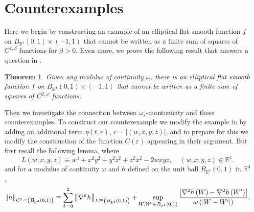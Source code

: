 \documentclass{amsart}
\newtheorem{theorem}{Theorem}[section]
\theoremstyle{plain}
\numberwithin{equation}{section}
\begin{document}
\section{Counterexamples}

Here we begin by constructing an example of an elliptical flat smooth
function $f$ on $B_{\mathbb{R}^{4}}\left( 0,1\right) \times \left(
-1,1\right) $ that cannot be written as a finite sum of squares of $%
C^{2,\beta }$ functions for $\beta >0$. Even more, we prove the following
result that answers a question in \cite[Remark 1.4]{BoBrCoPe}.

\begin{theorem}
Given any modulus of continuity $\omega $, there is an elliptical flat
smooth function $f$ on $B_{\mathbb{R}^{4}}\left( 0,1\right) \times \left(
-1,1\right) $ that cannot be written as a finite sum of squares of $%
C^{2,\omega }$ functions.
\end{theorem}

Then we investigate the connection between $\omega _{s}$-montonicity and
these counterexamples. To construct our counterexample we modify the example
in \cite[Theorem 1.2 (d)]{BoBrCoPe} by adding an additional term $\eta
\left( t,r\right) $, $r=\left\vert \left( w,x,y,z\right) \right\vert $, and
to prepare for this we modify the construction of the function $C\left(
\varepsilon \right) $ appearing in their argument. But first recall the
following lemma, where%
\begin{equation*}
L\left( w,x,y,z\right) \equiv w^{4}+x^{2}y^{2}+y^{2}z^{2}+z^{2}x^{2}-2wxyz,\
\ \ \ \ \left( w,x,y,z\right) \in \mathbb{R}^{4}.
\end{equation*}%
and for a modulus of continuity $\omega $ and $h$ defined on the unit ball $%
B_{\mathbb{R}^{4}}\left( 0,1\right) $ in $\mathbb{R}^{4}$, 
\begin{equation*}
\left\Vert h\right\Vert _{C^{2,\omega }\left( B_{\mathbb{R}^{4}}\left(
0,1\right) \right) }\equiv \sum_{k=0}^{2}\left\Vert \nabla ^{k}h\right\Vert
_{L^{\infty }\left( B_{\mathbb{R}^{4}}\left( 0,1\right) \right)
}+\sup_{W,W^{\prime }\in B_{\mathbb{R}^{4}}\left( 0,1\right) }\frac{%
\left\vert \nabla ^{2}h\left( W\right) -\nabla ^{2}h\left( W^{\prime
}\right) \right\vert }{\omega \left( \left\vert W-W^{\prime }\right\vert
\right) }.
\end{equation*}
\end{document}
